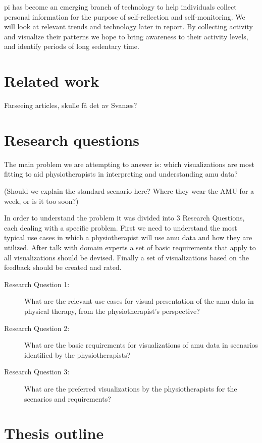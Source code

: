 \gls{pi} has become an emerging branch of technology to help individuals collect personal information for the purpose of self-reflection and self-monitoring. We will look at relevant trends and technology later in report. By collecting activity and visualize their patterns we hope to bring awareness to their activity levels, and identify periods of long sedentary time. 

\section{Related work}
Farseeing articles, skulle få det av Svanæs?

\section{Research questions}
The main problem we are attempting to answer is: which visualizations are most fitting to aid physiotherapists in interpreting and understanding \gls{amu} data?

(Should we explain the standard scenario here? Where they wear the AMU for a week, or is it too soon?)

In order to understand the problem it was divided into 3 Research Questions, each dealing with a specific problem. First we need to understand the most typical use cases in which a physiotherapist will use \gls{amu} data and how they are utilized. After talk with domain experts a set of basic requirements that apply to all visualizations should be devised. Finally a set of visualizations based on the feedback should be created and rated.

\begin{description}
\item[Research Question 1:] What are the relevant use cases for visual presentation of the \gls{amu} data in physical therapy, from the physiotherapist's perspective?

\item[Research Question 2:] What are the basic requirements for visualizations of \gls{amu} data in scenarios identified by the physiotherapists?

\item[Research Question 3:] What are the preferred visualizations by the physiotherapists for the scenarios and requirements?

\end{description}



\section{Thesis outline}